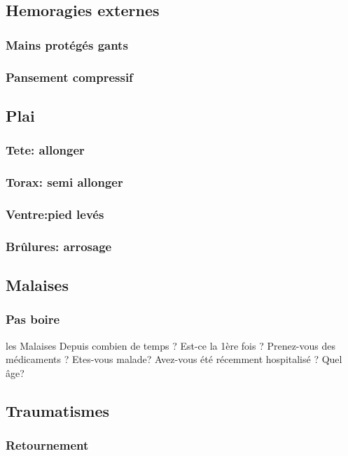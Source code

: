 \subsection{Hemoragies externes}
	\subsubsection{Mains protégés gants}
	\subsubsection{Pansement compressif}

\subsection{Plai}
	\subsubsection{Tete: allonger}
	\subsubsection{Torax: semi allonger}
	\subsubsection{Ventre:pied levés}
	\subsubsection{Brûlures: arrosage}

 \subsection{Malaises}
	\subsubsection{Pas boire}

\begin{frame}{les Malaises}{}
	Depuis combien de temps ?
	Est-ce la 1ère fois ?
	Prenez-vous des médicaments ?
	Etes-vous malade?
	Avez-vous été récemment hospitalisé ?
	Quel âge?
\end{frame}

\subsection{Traumatismes}
	\subsubsection{Retournement}
